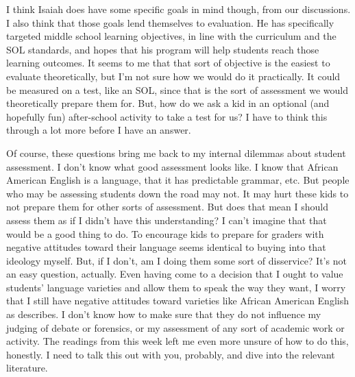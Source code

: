 \documentclass[doc,12pt]{apa6}
\begin{document}
I think Isaiah does have some specific goals in mind though, from our
discussions. I also think that those goals lend themselves to evaluation.  He
has specifically targeted middle school learning objectives, in line with the
curriculum and the SOL standards, and hopes that his program will help students
reach those learning outcomes. 
It seems to me that that sort of objective is the easiest to evaluate
theoretically, but I'm not sure how we would do it practically. It could be
measured on a test, like an SOL, since that is the sort of assessment we would
theoretically prepare them for. But, how do we ask a kid in an optional (and
hopefully fun) after-school activity to take a test for us? 
I have to think this through a lot more before I have an answer.

Of course, these questions bring me back to my internal dilemmas about student
assessment. I don't know what good assessment looks like. I know that African
American English is a language, that it has predictable grammar, etc. But
people who may be assessing students down the road may not. It may hurt these
kids to not prepare them for other sorts of assessment. 
But does that mean I should assess them as if I didn't have this understanding?
I can't imagine that that would be a good thing to do.  To encourage kids to
prepare for graders with negative attitudes toward their language seems
identical to buying into that ideology myself. But, if I don't, am I doing them
some sort of disservice? It's not an easy question, actually. 
Even having come to a decision that I ought to value students' language
varieties and allow them to speak the way they want, I worry that I still have
negative attitudes toward varieties like African American English as
 describes. I don't know how to make sure that they do not
influence my judging of debate or forensics, or my assessment of any sort of
academic work or activity. The readings from this week left me even more unsure
of how to do this, honestly. I need to talk this out with you, probably, and
dive into the relevant literature. 

\nocite{CharityHudley10}

\clearpage



\end{document}
